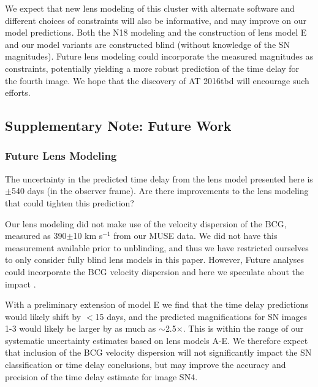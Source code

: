 \documentclass[12pt]{article}
\def\SNABC{AT 2016tbd\xspace}
\begin{document}
We expect that new lens modeling of this cluster with alternate software and different choices of constraints will also be informative, and may improve on our model predictions.  
Both the N18 modeling and the construction of lens model E and our model variants are constructed blind (without knowledge of the SN magnitudes).
Future lens modeling could incorporate the measured magnitudes as constraints, potentially yielding a more robust prediction of the time delay for the fourth image. We hope that the discovery of \SNABC  will encourage such efforts.  




\subsection*{Supplementary Note: Future Work}


\subsubsection*{Future Lens Modeling}

The uncertainty in the predicted time delay from the lens model presented here is $\pm$540 days (in the observer frame).  Are there improvements to the lens modeling that could tighten this prediction?

Our lens modeling did not make use of the velocity dispersion of the BCG, measured as 390$\pm$10 km s$^{-1}$ from our MUSE data.  We did not have this measurement available prior to unblinding, and thus we have restricted ourselves to only consider fully blind lens models in this paper. However,   Future analyses could incorporate the BCG velocity dispersion and here we speculate about the impact . 

With a preliminary extension of model E we find that the time delay predictions would likely shift by $<$15 days, and the predicted magnifications for SN images 1-3 would likely be larger by as much as $\sim$2.5$\times$.  This is within the range of our systematic uncertainty estimates based on lens models A-E.  We therefore expect that inclusion of the BCG velocity dispersion will not significantly impact the SN classification or time delay conclusions, but may improve the accuracy and precision of the time delay estimate for image SN4.  
\end{document}
